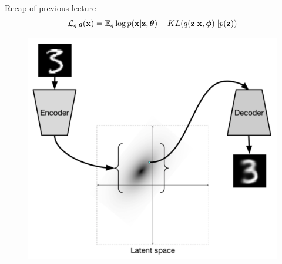 \documentclass{beamer}
\begin{document}
\begin{frame}{Recap of previous lecture}
	\vspace{-0.3cm}
	\[
	 	\mathcal{L}_{q, \boldsymbol{\theta}}(\mathbf{x}) = \mathbb{E}_{q} \log p(\mathbf{x} | \mathbf{z}, \boldsymbol{\theta}) - KL (q(\mathbf{z} | \mathbf{x}, \boldsymbol{\phi}) || p(\mathbf{z}))
	\]
	\vspace{-0.5cm}
	\begin{minipage}[t]{0.6\columnwidth}
		\begin{figure}[h]
			\centering
			\includegraphics[width=\linewidth]{figs/VAE}
		\end{figure}
	\end{minipage}%
	\begin{minipage}[t]{0.4\columnwidth}
		\begin{figure}[h]
			\centering

\end{figure}
\end{minipage}
\end{frame}
\end{document}
